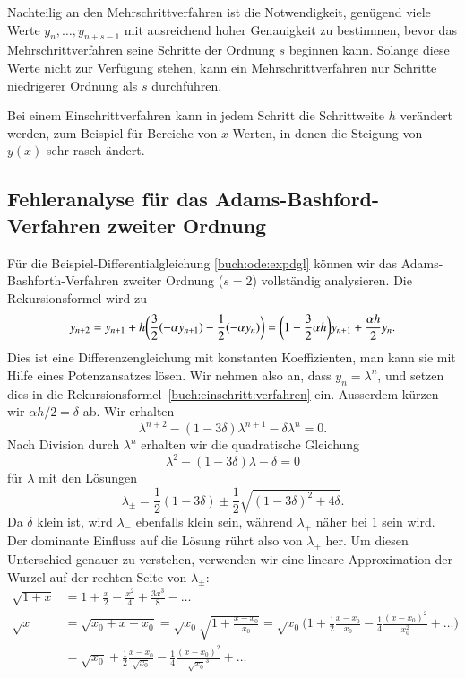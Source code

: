 Nachteilig an den Mehrschrittverfahren ist die Notwendigkeit,
genügend viele Werte $y_{n},\dots,y_{n+s-1}$ mit ausreichend
hoher Genauigkeit zu bestimmen, bevor das Mehrschrittverfahren
seine Schritte der Ordnung $s$ beginnen kann.
Solange diese Werte nicht zur Verfügung stehen, kann ein Mehrschrittverfahren
nur Schritte niedrigerer Ordnung als $s$ durchführen.

Bei einem Einschrittverfahren kann in jedem Schritt die Schrittweite $h$
verändert werden, zum Beispiel für Bereiche von $x$-Werten, in denen
die Steigung von $y(x)$ sehr rasch ändert.

\subsection{Fehleranalyse für das Adams-Bashford-Verfahren zweiter Ordnung
\label{buch:ode:subsection:fehleranalyse}}
Für die Beispiel-Differentialgleichung \eqref{buch:ode:expdgl} können
wir das Adams-Bashforth-Verfahren zweiter Ordnung ($s=2$) vollständig
analysieren.
Die Rekursionsformel wird zu
\begin{equation}
y_{n+2}=y_{n+1}+h\biggl(\frac32 (-\alpha y_{n+1})-\frac12(-\alpha y_n)\biggr)
=
\biggl(1-\frac32\alpha h\biggr)
y_{n+1}
+\frac{\alpha h}{2}
y_{n\mathstrut}.
\label{buch:einschritt:verfahren}
\end{equation}
Dies ist eine Differenzengleichung mit konstanten Koeffizienten, man kann
sie mit Hilfe eines Potenzansatzes lösen. 
%
%
Wir nehmen also an, dass $y_n=\lambda^n$, und setzen dies in die
Rekursionsformel~\eqref{buch:einschritt:verfahren} ein.
%
Ausserdem kürzen wir $\alpha h/2=\delta$  ab.
Wir erhalten
\[
\lambda^{n+2}-(1-3\delta)\lambda^{n+1}-\delta\lambda^n=0.
\]
Nach Division durch $\lambda^n$ erhalten wir die quadratische Gleichung
\[
\lambda^2-(1-3\delta )\lambda-\delta=0
\]
für $\lambda$ mit den Lösungen
\[
\lambda_\pm
=
\frac12(1-3\delta) \pm \frac12\sqrt{(1-3\delta)^2+4\delta}.
\]
Da $\delta$ klein ist, wird $\lambda_-$ ebenfalls klein sein,
während $\lambda_+$ näher bei $1$ sein wird.
Der dominante Einfluss auf die Lösung rührt also von $\lambda_+$ her.
Um diesen Unterschied genauer zu verstehen, verwenden wir eine
lineare Approximation der Wurzel auf der rechten Seite von $\lambda_\pm$:
%
\begin{align*}
\sqrt{1+x}
&=
1+\frac{x}{2}-\frac{x^2}{4}+\frac{3x^3}{8}-\dots
\\
\sqrt{x}
&=
\sqrt{x_0+x-x_0}
=
\sqrt{x_0}\sqrt{1+\frac{x-x_0}{x_0}}
=
\sqrt{x_0}\biggl(1+\frac12\frac{x-x_0}{x_0}-\frac14\frac{(x-x_0)^2}{x_0^2}+\dots\biggr)
\\
&=
\sqrt{x_0}+\frac12\frac{x-x_0}{\sqrt{x_0}}-\frac14\frac{(x-x_0)^2}{\sqrt{x_0}^3}+\dots
\end{align*}
